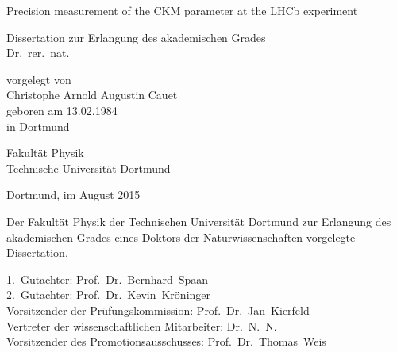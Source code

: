 
\begin{titlepage}

\vspace*{20ex}

{%
\Huge \sffamily \bfseries 
\begin{center}
  Precision measurement of the CKM parameter \sintwobetabfsf at the \acs*{LHCb} experiment
\end{center} 
}%

\begin{german}
{%
\LARGE \sffamily %
\begin{center}
  Dissertation zur Erlangung des akademischen Grades\\
  Dr.~rer.~nat.
\end{center}
}

\vspace{5ex}

{%
\Large \rmfamily
\begin{center}
  vorgelegt von \\ [0.8ex]
  Christophe Arnold Augustin Cauet \\ [0.8ex]
  geboren am 13.02.1984 \\
  in Dortmund
\end{center}
}

\vspace{5ex}

{%
\Large \rmfamily
\begin{center}
  Fakultät Physik\\
  Technische Universität Dortmund
\end{center}
}

\vspace{4ex}

{%
\Large \rmfamily
\begin{center}
  Dortmund, im August 2015
\end{center}
}

\clearpage
\thispagestyle{empty}
\vspace*{\fill}
{%
\small
  \noindent Der Fakultät Physik der Technischen Universität Dortmund zur Erlangung
  des aka\-de\-misch\-en Grades eines Doktors der Naturwissenschaften vorgelegte
  Dissertation.\\  
  
  \parbox{0.90\textwidth}{
    1.~Gutachter: Prof.~Dr.~Bernhard~Spaan \\
    2.~Gutachter: Prof.~Dr.~Kevin~Kröninger \\ [0.8ex]
    Vorsitzender der Prüfungskommission: Prof.~Dr.~Jan~Kierfeld \\
    Vertreter der wissenschaftlichen Mitarbeiter: Dr.~N.~N. \\ [0.8ex]
    Vorsitzender des Promotionsausschusses: Prof.~Dr.~Thomas~Weis \\ [0.8ex]
  }
}

\end{german}
\end{titlepage}

